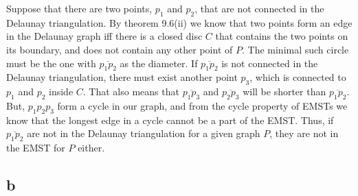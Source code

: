 \documentclass[11pt,a4paper]{article}
\begin{document}
Suppose that there are two points, $p_1$ and $p_2$, that are not
connected in the Delaunay triangulation. By theorem 9.6(ii) we know
that two points form an edge in the Delaunay graph iff there is a
closed disc $C$ that contains the two points on its boundary, and does
not contain any other point of $P$. The minimal such circle must be
the one with $\overline{p_1p_2}$ as the diameter. If
$\overline{p_1p_2}$ is not connected in the Delaunay triangulation,
there must exist another point $p_3$, which is connected to $p_1$ and
$p_2$ inside $C$. That also means that $\overline{p_1p_3}$ and
$\overline{p_2p_3}$ will be shorter than $\overline{p_1p_2}$. But,
$p_1p_2p_3$ form a cycle in our graph, and from the cycle property of
EMSTs we know that the longest edge in a cycle cannot be a part of the
EMST. Thus, if $\overline{p_1p_2}$ are not in the Delaunay
triangulation for a given graph $P$, they are not in the EMST for $P$
either.

\subsection{b}
\end{document}
